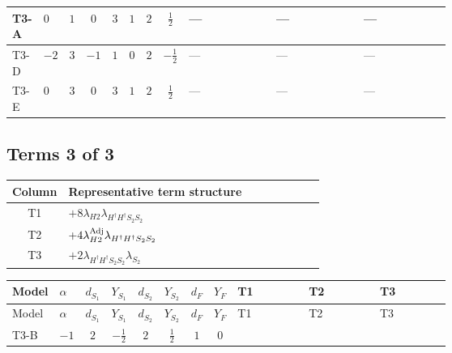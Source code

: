 \documentclass[8pt]{article}
\begin{document}
\begin{landscape}
\begin{longtable}{@{}llcccccc >{\raggedright\arraybackslash}p{0.21\linewidth} >{\raggedright\arraybackslash}p{0.21\linewidth} >{\raggedright\arraybackslash}p{0.21\linewidth}@{}}
\midrule
T3-A & $0$ & $1$ & $0$ & $3$ & $1$ & $2$ & $\frac{1}{2}$ & --- & --- & --- \\
\midrule
T3-D & $-2$ & $3$ & $-1$ & $1$ & $0$ & $2$ & $-\frac{1}{2}$ & --- & --- & --- \\
\midrule
T3-E & $0$ & $3$ & $0$ & $3$ & $1$ & $2$ & $\frac{1}{2}$ & --- & --- & --- \\
\midrule
\bottomrule
\end{longtable}
\clearpage
\subsection*{Terms 3 of 3}
\begin{center}
\begin{tabular}{@{}c >{\raggedright\arraybackslash}p{0.82\linewidth}@{}}
\toprule
Column & Representative term structure \\
\midrule
T1 & \(\displaystyle +8 {\lambda_{H2}} {\lambda_{H^\dagger H^\dagger S_2 S_2}}\) \\
\midrule
T2 & \(\displaystyle +4 {\lambda_{H2}^{\rm Adj}} {\lambda_{H^\dagger H^\dagger S_2 S_2}}\) \\
\midrule
T3 & \(\displaystyle +2 {\lambda_{H^\dagger H^\dagger S_2 S_2}} {\lambda_{S_2}}\) \\
\midrule
\bottomrule
\end{tabular}
\end{center}
\smallskip
\tiny
\begin{longtable}{@{}llcccccc >{\raggedright\arraybackslash}p{0.21\linewidth} >{\raggedright\arraybackslash}p{0.21\linewidth} >{\raggedright\arraybackslash}p{0.21\linewidth}@{}}
\toprule
Model & $\alpha$ & $d_{S_1}$ & $Y_{S_1}$ & $d_{S_2}$ & $Y_{S_2}$ & $d_F$ & $Y_F$ & T1 & T2 & T3 \\
\midrule
\endfirsthead
\toprule
Model & $\alpha$ & $d_{S_1}$ & $Y_{S_1}$ & $d_{S_2}$ & $Y_{S_2}$ & $d_F$ & $Y_F$ & T1 & T2 & T3 \\
\midrule
\endhead
T3-B & $-1$ & $2$ & $-\frac{1}{2}$ & $2$ & $\frac{1}{2}$ & $1$ & $0$ & \scriptsize\adjustbox{max width=\linewidth}{$\begin{gathered} +8 {\lambda_{H2}} {\lambda_{H^\dagger H^\dagger S_2 S_2}}\end{gathered}$} & \scriptsize\adjustbox{max width=\linewidth}{$\begin{gathered} +4 {\lambda_{H2}^{\rm Adj}} {\lambda_{H^\dagger H^\dagger S_2 S_2}}\end{gathered}$} & \scriptsize\adjustbox{max width=\linewidth}{$\begin{gathered} +2 {\lambda_{H^\dagger H^\dagger S_2 S_2}} {\lambda_{S_2}}\end{gathered}$} \\

\end{longtable}
\end{landscape}
\end{document}
